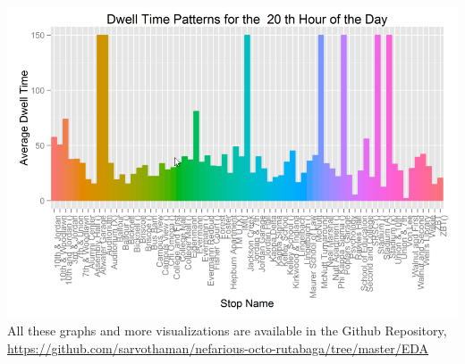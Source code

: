 \documentclass[12pt]{article}
\begin{document}
\includegraphics[scale=0.4]{resources/ggplot5}\\[1cm] 
All these graphs and more visualizations are available in the Github Repository, \url{https://github.com/sarvothaman/nefarious-octo-rutabaga/tree/master/EDA}
\end{document}

